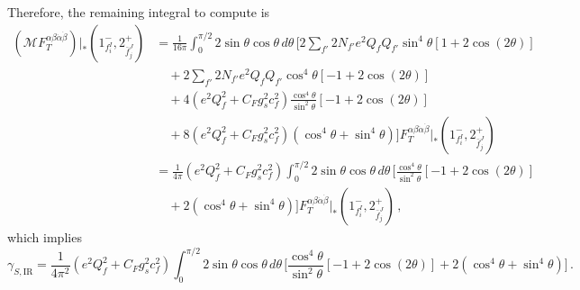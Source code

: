 Therefore, the remaining integral to compute is
\begin{align}
    (\mathcal M F_T^{\alpha\beta\dot\alpha\dot\beta})|_{*}(1^-_{f_i^I},2^+_{\bar f_j^J}) &= \frac{1}{16\pi}\int_0^{\pi/2}2\sin\theta\cos\theta \,d\theta\,\bigg[2\sum_{f'}2 N_{f'}e^2Q_f Q_{f'}\sin^4\theta [1+2\cos(2\theta)]\nonumber \\
    &\quad +2\sum_{f'}2 N_{f'}e^2Q_f Q_{f'}\cos^4\theta[-1+2\cos(2\theta)]\nonumber \\
    &\quad +4(e^2Q_f^2+C_Fg_s^2c_f^2)\frac{\cos^4\theta}{\sin^2\theta}[-1+2\cos(2\theta)]\nonumber \\
    &\quad  +8(e^2Q_f^2+C_Fg_s^2c_f^2)(\cos^4\theta + \sin^4\theta)
    \bigg]F_T^{\alpha\beta\dot\alpha\dot\beta}|_{*}(1^-_{f_i^I},2^+_{\bar f_j^J})\nonumber \\
    &= \frac{1}{4\pi}(e^2Q_f^2+C_Fg_s^2c_f^2)\int_0^{\pi/2}2\sin\theta\cos\theta \,d\theta\,\bigg[\frac{\cos^4\theta}{\sin^2\theta}[-1+2\cos(2\theta)]\nonumber\\
    &\quad +2(\cos^4\theta + \sin^4\theta) \bigg]
    F_T^{\alpha\beta\dot\alpha\dot\beta}|_{*}(1^-_{f_i^I},2^+_{\bar f_j^J})\,,
\end{align}
which implies
\begin{equation}\label{eq:gammaS_IR_angular}
    \gamma_{S,\text{IR}} = \frac{1}{4\pi^2}(e^2Q_f^2+C_Fg_s^2c_f^2)\int_0^{\pi/2}2\sin\theta\cos\theta \,d\theta\,\bigg[\frac{\cos^4\theta}{\sin^2\theta}[-1+2\cos(2\theta)]+2(\cos^4\theta + \sin^4\theta) \bigg]\,.
\end{equation}


